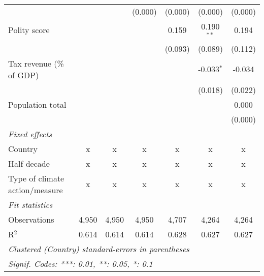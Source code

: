 \begin{tabular}{lcccccc}
                                                                             &              &              & (0.000)       & (0.000)        & (0.000)        & (0.000)\\   
   Polity score                                                              &              &              &               & 0.159          & 0.190$^{**}$   & 0.194\\   
                                                                             &              &              &               & (0.093)        & (0.089)        & (0.112)\\   
   Tax revenue (\% of GDP)                                                   &              &              &               &                & -0.033$^{*}$   & -0.034\\   
                                                                             &              &              &               &                & (0.018)        & (0.022)\\   
   Population total                                                          &              &              &               &                &                & 0.000\\   
                                                                             &              &              &               &                &                & (0.000)\\   
   \emph{Fixed effects}\\
   Country                                                                   & x            & x            & x             & x              & x              & x\\  
   Half decade                                                               & x            & x            & x             & x              & x              & x\\  
   Type of climate action/measure                                            & x            & x            & x             & x              & x              & x\\  
   \midrule \emph{Fit statistics}\\
   Observations                                                              & 4,950        & 4,950        & 4,950         & 4,707          & 4,264          & 4,264\\  
   R$^2$                                                                     & 0.614        & 0.614        & 0.614         & 0.628          & 0.627          & 0.627\\  
   \midrule
   \multicolumn{7}{l}{\emph{Clustered (Country) standard-errors in parentheses}}\\
   \multicolumn{7}{l}{\emph{Signif. Codes: ***: 0.01, **: 0.05, *: 0.1}}\\
\end{tabular}
\par\endgroup


